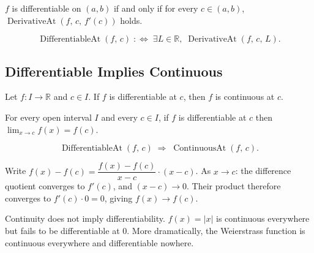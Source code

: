 \begin{remark*}
$f$ is differentiable on $(a,b)$ if and only if for every $c \in (a,b)$,
$\operatorname{DerivativeAt}(f,\,c,\,f'(c))$ holds.
\end{remark*}

\begin{remark*}
\[
\operatorname{DifferentiableAt}(f,\,c)
\;:\iff\;
\exists L \in \mathbb{R},\;\operatorname{DerivativeAt}(f,\,c,\,L).
\]
\end{remark*}

\subsection{Differentiable Implies Continuous}

\begin{theorem}
\label{thm:differentiable-implies-continuous}
Let $f : I \to \mathbb{R}$ and $c \in I$.
If $f$ is differentiable at $c$, then $f$ is continuous at $c$.
\end{theorem}

\begin{remark*}
For every open interval $I$ and every $c \in I$, if $f$ is differentiable at $c$
then $\lim_{x \to c} f(x) = f(c)$.
\end{remark*}

\begin{remark*}
\[
\operatorname{DifferentiableAt}(f,\,c)
\;\Rightarrow\;
\operatorname{ContinuousAt}(f,\,c).
\]
\end{remark*}

\begin{remark}
Write $f(x) - f(c) = \dfrac{f(x)-f(c)}{x-c} \cdot (x-c)$.
As $x \to c$: the difference quotient converges to $f'(c)$,
and $(x-c) \to 0$. Their product therefore converges to $f'(c) \cdot 0 = 0$,
giving $f(x) \to f(c)$.
\end{remark}

\begin{remark}
Continuity does not imply differentiability.
$f(x) = |x|$ is continuous everywhere but fails to be differentiable at $0$.
More dramatically, the Weierstrass function is continuous everywhere
and differentiable nowhere.
\end{remark}

